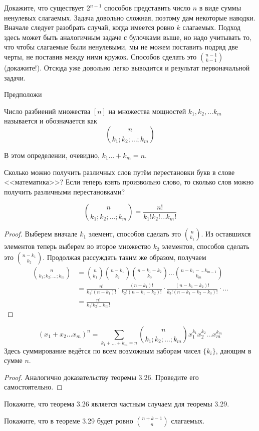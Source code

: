 \begin{exercise}
Докажите, что существует $2^{n-1}$ способов представить число $n$ в виде суммы ненулевых слагаемых. Задача довольно сложная, поэтому дам некоторые наводки. Вначале следует разобрать случай, когда имеется ровно $k$ слагаемых. Подход здесь может быть аналогичным задаче с булочками выше, но надо учитывать то, что чтобы слагаемые были ненулевыми, мы не можем поставить подряд две черты, не поставив между ними кружок. Способов сделать это $n-1\choose k -1$ (докажите!). Отсюда уже довольно легко выводится и результат первоначальной задачи.
\end{exercise}

Предположи

\begin{definition}
Число разбиений множества $[n]$ на множества мощностей $k_1, k_2, \ldots k_m$ называется  и обозначается как
$$n \choose k_1; k_2;\ldots; k_m$$
\end{definition}

В этом определении, очевидно, $k_1\ldots+ k_m = n$.

\begin{exercise}
Сколько можно получить различных слов путём перестановки букв в слове <<математика>>? Если теперь взять произвольно слово, то сколько слов можно получить различными перестановками?
\end{exercise}

\begin{thm}
$${n \choose k_1; k_2;\ldots; k_m} = \frac{n!}{k_1!k_2!\ldots k_m!}$$
\end{thm}
\begin{proof}
Выберем вначале $k_1$ элемент, способов сделать это $n\choose k_1$. Из оставшихся элементов теперь выберем во второе множество $k_2$ элементов, способов сделать это $n-k_1\choose k_2$. Продолжая рассуждать таким же образом, получаем
\begin{align*}
{n \choose k_1; k_2;\ldots; k_m} & = {n\choose k_1}{n-k_1\choose k_2}{n-k_1-k_2\choose k_3}\ldots{n-k_1-\ldots k_{m-1}\choose k_m} \\
&= \frac{n!}{k_1!(n-k_1)!}\cdot\frac{(n-k_1)!}{k_2!(n-k_1-k_2)!}\cdot\frac{(n-k_1-k_2)!}{k_3!(n-k_1-k_2-k_3)!}\cdot\ldots\\
&=\frac{n!}{k_1!k_2!\ldots k_m!}
\end{align*}
\end{proof}

\begin{thm}
$$(x_1+x_2\ldots x_m)^n = \sum_{k_1+\ldots + k_m = n}{n\choose k_1;k_2;\ldots;k_m}x_1^{k_1}x_2^{k_2}\ldots x_m^{k_m}$$
Здесь суммирование ведётся по всем возможным наборам чисел $\{k_i\}$, дающим в сумме $n$.
\end{thm}
\begin{proof}
Аналогично доказательству теоремы 3.26. Проведите его самостоятельно.
\end{proof}

\begin{exercise}
Покажите, что теорема 3.26 является частным случаем для теоремы 3.29.
\end{exercise}

\begin{exercise}
Покажите, что в теореме 3.29 будет ровно $n + k - 1 \choose n$ слагаемых.
\end{exercise}